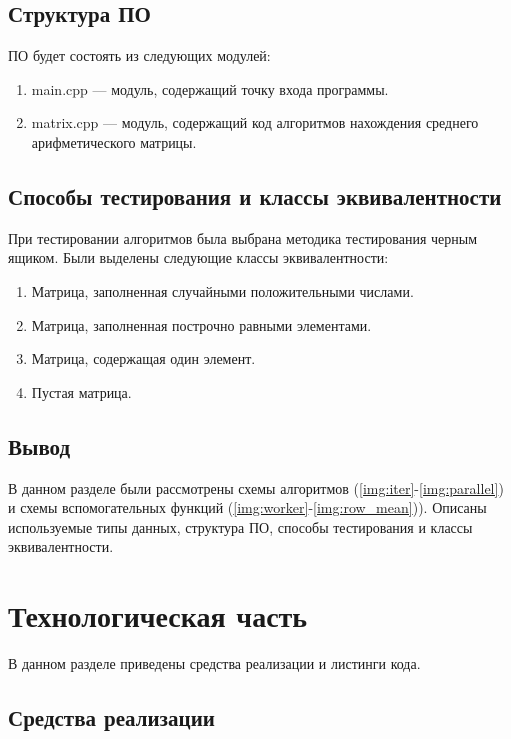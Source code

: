 \subsection{Структура ПО}

ПО будет состоять из следующих модулей:

\begin{enumerate}
	\item main.cpp --- модуль, содержащий точку входа программы.
	\item matrix.cpp --- модуль, содержащий код алгоритмов нахождения среднего арифметического матрицы.
\end{enumerate}

\subsection{Способы тестирования и классы эквивалентности}

При тестировании алгоритмов была выбрана методика тестирования черным ящиком. Были выделены следующие классы эквивалентности:

\begin{enumerate}
	\item Матрица, заполненная случайными положительными числами.
	\item Матрица, заполненная построчно равными элементами.
	\item Матрица, содержащая один элемент.
	\item Пустая матрица.
\end{enumerate}

\subsection{Вывод}

В данном разделе были рассмотрены схемы алгоритмов (\ref{img:iter}-\ref{img:parallel}) и схемы вспомогательных функций (\ref{img:worker}-\ref{img:row_mean})). Описаны используемые типы данных, структура ПО, способы тестирования и классы эквивалентности.

\section{Технологическая часть}

В данном разделе приведены средства реализации и листинги кода.

\subsection{Средства реализации}

